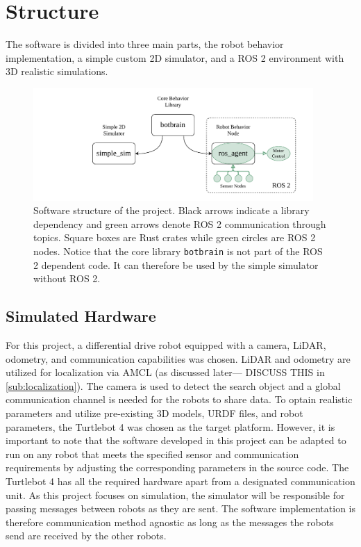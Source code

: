 \section{Structure}
The software is divided into three main parts, the robot behavior implementation, a simple custom 2D
simulator, and a ROS 2 environment with 3D realistic simulations.
\begin{figure}[H]
    \begin{center}
        \includegraphics[width=0.95\textwidth]{figures/software-structure.pdf}
    \end{center}
    \caption{Software structure of the project. Black arrows indicate a library dependency and green arrows denote ROS 2 communication through topics. Square boxes are Rust crates while green circles are ROS 2 nodes. Notice that the core library \texttt{botbrain} is not part of the ROS 2 dependent code. It can therefore be used by the simple simulator without ROS 2.}\label{fig:}
\end{figure}

\subsection{Simulated Hardware}

For this project, a differential drive robot equipped with a camera, LiDAR, odometry, and communication capabilities was chosen. LiDAR and odometry are utilized for localization via AMCL (as discussed later---{\color{red} DISCUSS THIS} in \cref{sub:localization}). The camera is used to detect the search object and a global communication channel is needed for the robots to share data. To optain realistic parameters and utilize pre-existing 3D models, URDF files, and robot parameters, the Turtlebot 4 \cite{tb4} was chosen as the target platform. However, it is important to note that the software developed in this project can be adapted to run on any robot that meets the specified sensor and communication requirements by adjusting the corresponding parameters in the source code.
The Turtlebot 4 has all the required hardware apart from a {\color{red} designated communication unit}. As this project focuses on simulation, the simulator will be responsible for passing messages between robots as they are sent. The software implementation is therefore {\color{red} communication method agnostic} as long as the messages the robots send are received by the other robots.

